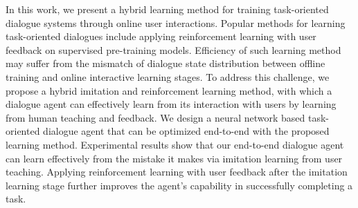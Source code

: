 In this work, we present a hybrid learning method for training task-oriented dialogue systems through online user interactions. Popular methods for learning task-oriented dialogues include applying reinforcement learning with user feedback on supervised pre-training models. Efficiency of such learning method may suffer from the mismatch of dialogue state distribution between offline training and online interactive learning stages. To address this challenge, we propose a hybrid imitation and reinforcement learning method, with which a dialogue agent can effectively learn from its interaction with users by learning from human teaching and feedback. We design a neural network based task-oriented dialogue agent that can be optimized end-to-end with the proposed learning method. Experimental results show that our end-to-end dialogue agent can learn effectively from the mistake it makes via imitation learning from user teaching. Applying reinforcement learning with user feedback after the imitation learning stage further improves the agent's capability in successfully completing a task.

